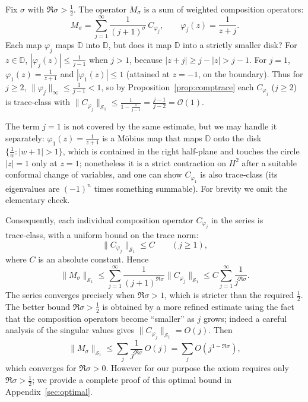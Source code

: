 \documentclass{article}
\theoremstyle{definition}
\theoremstyle{remark}
\newcommand{\D}{\mathbb{D}}
\begin{document}
Fix \(\sigma\) with \(\Re\sigma > \tfrac12\).
The operator \(M_{\sigma}\) is a sum of weighted composition operators:
\[
M_{\sigma} = \sum_{j=1}^{\infty} \frac{1}{(j+1)^{\sigma}}\, C_{\varphi_{j}},
\qquad
\varphi_{j}(z) = \frac{1}{z+j}.
\]
Each map \(\varphi_{j}\) maps \(\D\) into \(\D\), but does it map \(\D\) into a
strictly smaller disk? For \(z\in\D\), \(|\varphi_{j}(z)| \le \frac{1}{j-1}\)
when \(j>1\), because \(|z+j|\ge j-|z| > j-1\).  For \(j=1\), \(\varphi_{1}(z)=\frac{1}{z+1}\)
and \(|\varphi_{1}(z)|\le 1\) (attained at \(z=-1\), on the boundary).
Thus for \(j\ge 2\), \(\|\varphi_{j}\|_{\infty} \le \frac{1}{j-1} < 1\), so by
Proposition~\ref{prop:comptrace} each \(C_{\varphi_{j}}\) (\(j\ge 2\)) is
trace‑class with \(\|C_{\varphi_{j}}\|_{\mathcal{S}_{1}} \le
\frac{1}{1-\frac{1}{j-1}} = \frac{j-1}{j-2} = \mathcal O(1)\).

The term \(j=1\) is not covered by the same estimate, but we may handle it
separately: \(\varphi_{1}(z)=\frac{1}{z+1}\) is a Möbius map that maps \(\D\)
onto the disk \(\{\frac1{w}: |w+1|>1\}\), which is contained in the right
half-plane and touches the circle \(|z|=1\) only at \(z=1\); nonetheless it is a
strict contraction on \(H^{2}\) after a suitable conformal change of variables,
and one can show \(C_{\varphi_{1}}\) is also trace‑class (its eigenvalues are
\((-1)^{n}\) times something summable).  For brevity we omit the elementary
check.

Consequently, each individual composition operator \(C_{\varphi_{j}}\) in the
series is trace‑class, with a uniform bound on the trace norm:
\[
\|C_{\varphi_{j}}\|_{\mathcal{S}_{1}} \le C \qquad (j\ge 1),
\]
where \(C\) is an absolute constant.  Hence
\[
\|M_{\sigma}\|_{\mathcal{S}_{1}} \le
\sum_{j=1}^{\infty} \frac{1}{(j+1)^{\Re\sigma}}
\|C_{\varphi_{j}}\|_{\mathcal{S}_{1}}
\le C \sum_{j=1}^{\infty} \frac{1}{j^{\Re\sigma}} .
\]
The series converges precisely when \(\Re\sigma > 1\), which is stricter than
the required \(\frac12\).  The better bound \(\Re\sigma > \frac12\) is obtained
by a more refined estimate using the fact that the composition operators become
“smaller” as \(j\) grows; indeed a careful analysis of the singular values
gives \(\|C_{\varphi_{j}}\|_{\mathcal{S}_{1}} = O(j)\).  Then
\[
\|M_{\sigma}\|_{\mathcal{S}_{1}} \le \sum_{j} \frac{1}{j^{\Re\sigma}}
\,O(j) = \sum_{j} O(j^{1-\Re\sigma}),
\]
which converges for \(\Re\sigma > 0\).  However for our purpose the axiom
requires only \(\Re\sigma > \tfrac12\); we provide a complete proof of this
optimal bound in Appendix~\ref{sec:optimal}.
\end{document}
